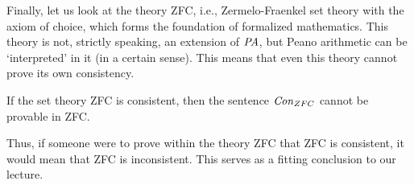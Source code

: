    Finally, let us look at the theory ZFC, i.e., Zermelo-Fraenkel set theory with the axiom of choice, which forms the foundation of formalized mathematics. This theory is not, strictly speaking, an extension of $\text{\it PA}$, but Peano arithmetic can be `interpreted' in it (in a certain sense). This means that even this theory cannot prove its own consistency.
    
    \begin{corollary}
        If the set theory ZFC is consistent, then the sentence $\mathit{Con}_{ZFC}$ cannot be provable in ZFC.
    \end{corollary}
    
    Thus, if someone were to prove within the theory ZFC that ZFC is consistent, it would mean that ZFC is inconsistent. This serves as a fitting conclusion to our lecture.
